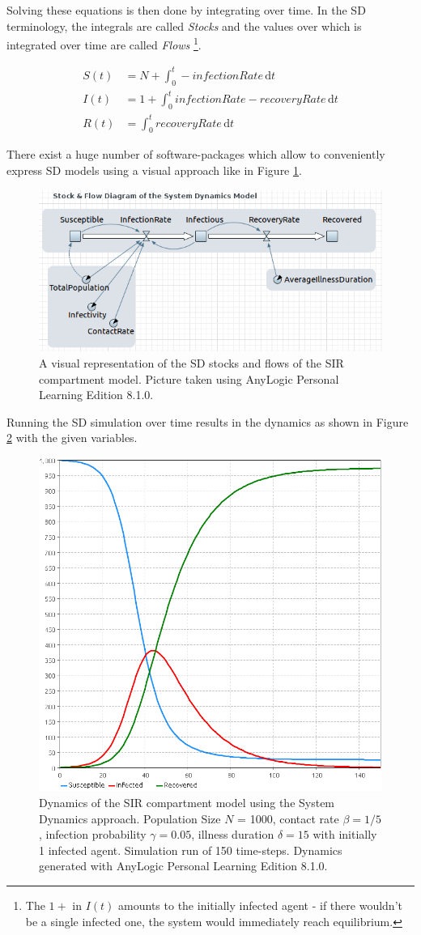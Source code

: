 Solving these equations is then done by integrating over time. In the SD terminology, the integrals are called \textit{Stocks} and the values over which is integrated over time are called \textit{Flows} \footnote{The $1+$ in $I(t)$ amounts to the initially infected agent - if there wouldn't be a single infected one, the system would immediately reach equilibrium.}.

\begin{align*}
S(t) &= N + \int_0^t -infectionRate\, \mathrm{d}t \\
I(t) &= 1 + \int_0^t infectionRate - recoveryRate\, \mathrm{d}t \\
R(t) &= \int_0^t recoveryRate\, \mathrm{d}t
\end{align*}

There exist a huge number of software-packages which allow to conveniently express SD models using a visual approach like in Figure \ref{fig:sir_sd_stockflow_diagramm}.

\begin{figure}
	\centering
	\includegraphics[width=.4\textwidth, angle=0]{./../shared/fig/SIR_SD_STOCKFLOW_DIAGRAMM.png}
	\caption{A visual representation of the SD stocks and flows of the SIR compartment model. Picture taken using AnyLogic Personal Learning Edition 8.1.0.}
	\label{fig:sir_sd_stockflow_diagramm}
\end{figure}

Running the SD simulation over time results in the dynamics as shown in Figure \ref{fig:sir_sd_dynamics_anylogic} with the given variables.

\begin{figure}
	\centering
	\includegraphics[width=.4\textwidth, angle=0]{./../shared/fig/SIR_SD_DYNAMICS_ANYLOGIC.png}
	\caption{Dynamics of the SIR compartment model using the System Dynamics approach. Population Size $N$ = 1000, contact rate $\beta = 1/5$, infection probability $\gamma = 0.05$, illness duration $\delta = 15$ with initially 1 infected agent. Simulation run of 150 time-steps. Dynamics generated with AnyLogic Personal Learning Edition 8.1.0.}
	\label{fig:sir_sd_dynamics_anylogic}
\end{figure}


